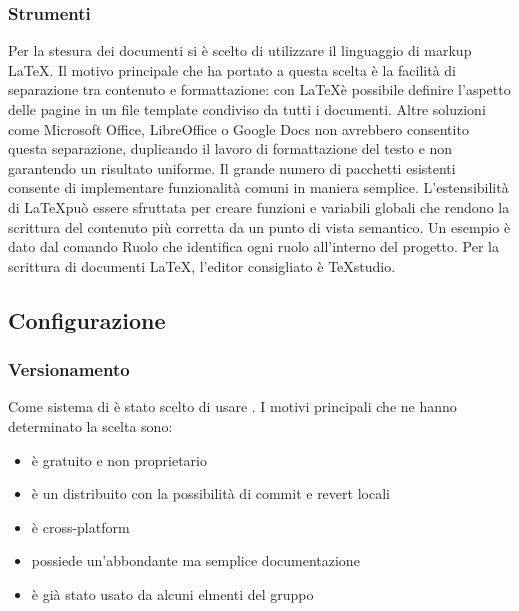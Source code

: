 \documentclass[12pt,a4paper]{article}
\begin{document}
\subsubsection{Strumenti}
Per la stesura dei documenti si è scelto di utilizzare il linguaggio di markup \LaTeX. Il motivo principale che ha portato a questa scelta è la facilità di separazione tra contenuto e formattazione: con \LaTeX è possibile definire l’aspetto delle pagine in un file template condiviso da tutti i documenti. Altre soluzioni come Microsoft Office, LibreOffice o Google Docs non avrebbero consentito questa separazione, duplicando il lavoro di formattazione del testo e non garantendo un risultato uniforme. Il grande numero di pacchetti esistenti consente di implementare funzionalità comuni in maniera semplice. L’estensibilità di \LaTeX può essere sfruttata per creare funzioni e variabili globali che rendono la scrittura del contenuto più corretta da un punto di vista semantico. Un esempio è dato dal comando Ruolo che identifica ogni ruolo all’interno del progetto. Per la scrittura di documenti \LaTeX, l’editor consigliato è TeXstudio.























\subsection{Configurazione} %

\subsubsection{Versionamento}\label{versionamento} %
Come sistema di  è stato scelto di usare . I motivi principali che ne hanno determinato la scelta sono:
\begin{itemize}
	\item è gratuito e non proprietario
	\item è un  distribuito con la possibilità di commit e revert locali
	\item è cross-platform
	\item possiede un'abbondante ma semplice documentazione
	\item è già stato usato da alcuni elmenti del gruppo
\end{itemize}
\end{document}
